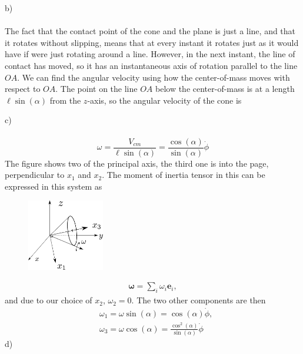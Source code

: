 \documentclass{article}
\begin{document}
        b) \\ \\
        The fact that the contact point of the cone and the plane is just a line, and that it rotates without slipping, means that at every instant it rotates just as it would have if were just rotating around a line. However, in the next instant, the line of contact has moved, so it has an instantaneous axis of rotation parallel to the line $OA$. We can find the angular velocity using how the center-of-mass moves with respect to $OA$. The point on the line $OA$ below the center-of-mass is at a length $\ell \sin(\alpha)$ from the $z$-axis, so the angular velocity of the cone is

        c) \\ \\        
        \begin{equation*}
            \omega = \frac{V_{cm}}{\ell \sin(\alpha)} = \frac{\cos(\alpha)}{\sin(\alpha)} \dot \phi
        \end{equation*}  
        The figure shows two of the principal axis, the third one is into the page, perpendicular to $x_1$ and $x_2$. The moment of inertia tensor in this can be expressed in this system as 
        \newpage %
        \begin{figure}         
            \includegraphics[width=0.3\textwidth]{figures/exercise_7_3_cone3.pdf}
        \end{figure}
        \begin{align*}
            \boldsymbol{\omega} = \sum_i \omega_i \mathbf{e}_i,
        \end{align*}
        and due to our choice of $x_2$, $\omega_2 = 0$. The two other components are then
        \begin{align*}
            &\omega_1 = \omega \sin(\alpha) =  \cos(\alpha) \dot \phi,  \\
            &\omega_3 = \omega \cos(\alpha) =  \frac{\cos^2(\alpha)}{\sin(\alpha)} \dot \phi
        \end{align*}
        d) \\ \\
\end{document}
